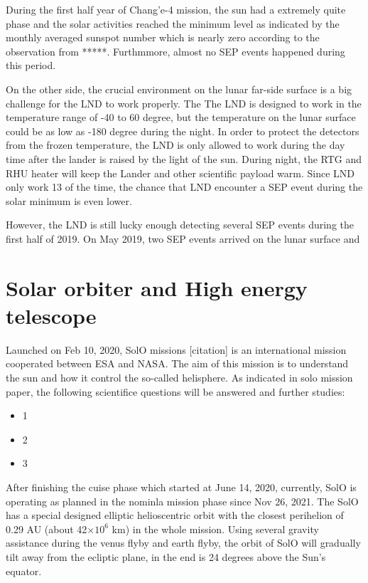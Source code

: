 During the first half year of Chang'e-4 mission, the sun had a extremely quite phase and the solar activities reached the minimum level as indicated by the monthly averaged sunspot number which is nearly zero according to the observation from *****. Furthmmore, almost no SEP events happened during this period. 

On the other side, the crucial environment on the lunar far-side surface is a big challenge for the LND to work properly. The
The LND is designed to work in the temperature range of -40 to 60 degree, but the temperature on the lunar surface could be as low as -180 degree during the night.
In order to protect the detectors from the frozen temperature, the LND is only allowed to work during the day time after the lander is raised by the light of the sun.
During night, the RTG and RHU heater will keep the Lander and other scientific payload warm. 
Since LND only work 1\/3 of the time, the chance that LND encounter a SEP event during the solar minimum is even lower.

However, the LND is still lucky enough detecting several SEP events during the first half of 2019. 
On May 2019, two SEP events arrived on the lunar surface and 





\section{Solar orbiter and High energy telescope}

Launched on Feb 10, 2020, \acl{SolO} missions [citation] is an international mission cooperated between \ac{ESA} and \ac{NASA}. The aim of this mission is to understand the sun and how it control the so-called helisphere. As indicated in solo mission paper, the following scientifice questions will be answered and further studies:
\begin{itemize}
	\item 1
	\item 2
	\item 3
\end{itemize}
After finishing the cuise phase which started at June 14, 2020, currently, \ac{SolO} is operating as planned in the nominla mission phase since Nov 26, 2021.
The \ac{SolO} has a special designed elliptic helioscentric orbit with the closest perihelion of 0.29 AU (about 42$\times10^6$ km) in the whole mission. Using several gravity assistance during the venus flyby and earth flyby, the orbit of SolO will gradually tilt away from the ecliptic plane, in the end is 24 degrees above the Sun's equator.

